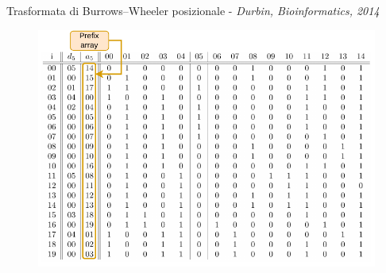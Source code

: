 \documentclass[]{beamer}
\begin{document}
\begin{frame}{{\small{Trasformata di Burrows--Wheeler posizionale -}} {\scriptsize{\textit{Durbin, Bioinformatics,
               2014}}}}
{    %
    \begin{figure}[H]
      \centering
      \includegraphics[scale = 0.8]{img/pa.pdf}
    \end{figure}
  }
\end{frame}
\end{document}
